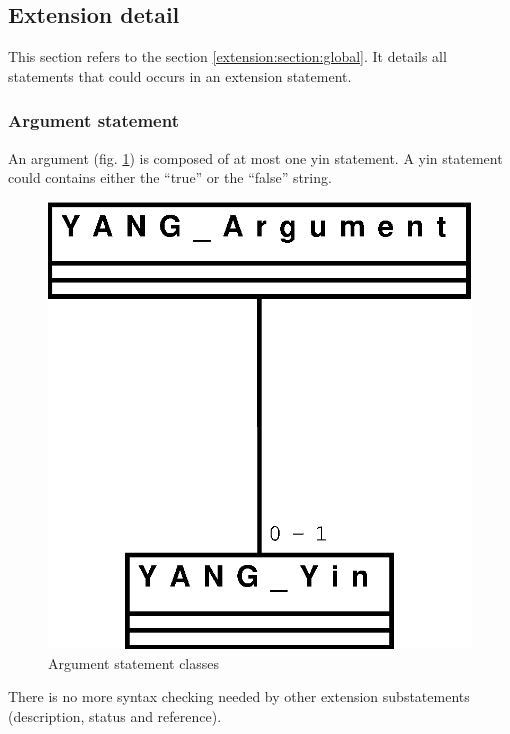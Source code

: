 \documentclass[a4paper]{article}
\begin{document}
\subsection{Extension detail}
\label{extension:section:detail}

This section refers  to the section \ref{extension:section:global}. It
details all statements that could occurs in an extension statement.

\subsubsection{Argument statement}

An  argument (fig.   \ref{argument}) is  composed of  at most  one yin
statement. A yin  statement could contains either the  ``true'' or the
``false'' string.
\begin{figure}[htbp]
\begin{center}
\includegraphics[scale = .3]{argument.eps}
\end{center}
\caption{Argument statement classes}
\label{argument}
\end{figure}

There is no more syntax checking needed by other extension
substatements (description, status and reference).
\end{document}
